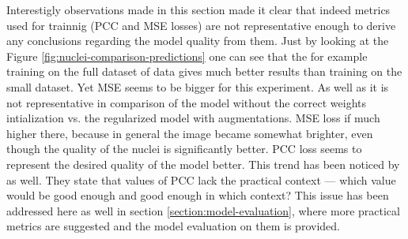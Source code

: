 Interestigly observations made in this section made it clear that indeed metrics used for trainnig (PCC and MSE losses) are not representative enough to derive any conclusions regarding the model quality from them. Just by looking at the Figure \ref{fig:nuclei-comparison-predictions} one can see that the for example training on the full dataset of data gives much better results than training on the small dataset. Yet MSE seems to be bigger for this experiment. As well as it is not representative in comparison of the model without the correct weights intialization vs. the regularized model with augmentations. MSE loss if much higher there, because in general the image became somewhat brighter, even though the quality of the nuclei is significantly better. PCC loss seems to represent the desired quality of the model better. This trend has been noticed by \cite{Lachance_2020} as well. They state that values of PCC lack the practical context --- which value would be good enough and good enough in which context? This issue has been addressed here as well in section \ref{section:model-evaluation}, where more practical metrics are suggested and the model evaluation on them is provided.